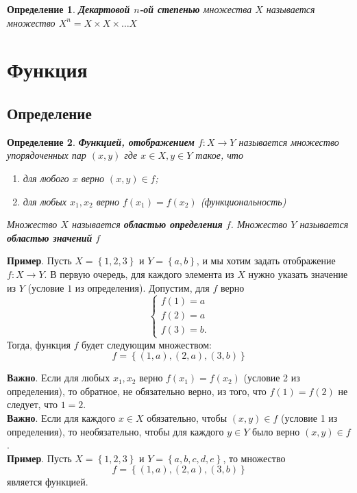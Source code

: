 \documentclass[]{article}
\newtheorem{dfn}{Определение}
\begin{document}
	\begin{dfn}
	\textbf{Декартовой $n$-ой степенью} множества $X$ называется множество $X^n=X\times X\times \ldots X$ 
	\end{dfn}
	\section{Функция}
	\subsection{Определение}
	\begin{dfn}
		\textbf{Функцией, отображением} $f:X\rightarrow Y$ называется множество  упорядоченных пар $(x,y)$ где $x\in X, y\in Y$ такое, что 
		\begin{enumerate}
			\item для любого $x$ верно  $(x,y)\in f$; 
			\item для любых $x_1, x_2$ верно  $f(x_1)=f(x_2)$
			(функциональность)
		\end{enumerate}
		Множество $X$ называется \textbf{областью определения} $f$.
		Множество $Y$ называется \textbf{областью значений} $f$
	\end{dfn}
	\textbf{Пример}. Пусть $X=\left\{1,2,3\right\}$ и $Y=\left\{a,b\right\}$, и мы хотим задать отображение $f:X\rightarrow Y$. В первую очередь, для каждого элемента из $X$ нужно указать значение из $Y$ (условие $1$ из определения). Допустим, для $f$ верно
	\begin{equation}
	\begin{cases}
	f(1)=a
	\\
	f(2)=a
	\\
	f(3)=b.
\end{cases}
	\end{equation}
Тогда, функция $f$ будет следующим множеством:
\begin{equation}
	f=\left\{(1,a),(2,a),(3,b)\right\}
\end{equation}

\textbf{Важно}. Если для любых $x_1, x_2$ верно $f(x_1)=f(x_2)$ (условие 2 из определения), то обратное, не обязательно верно, из того, что $f(1)=f(2)$ не следует, что $1=2$.
\\

\textbf{Важно}. Если для каждого $x\in X$ обязательно, чтобы $(x,y)\in f$ (условие 1 из определения), то необязательно, чтобы для каждого $y\in Y$ было верно $(x,y)\in f$.
\\

\textbf{Пример}. Пусть $X=\left\{1,2,3\right\}$ и $Y=\left\{a,b,c,d,e\right\}$, то множество 
\begin{equation}
	f=\left\{(1,a),(2,a),(3,b)\right\}
\end{equation}
является функцией.
\\
	
\end{document}
